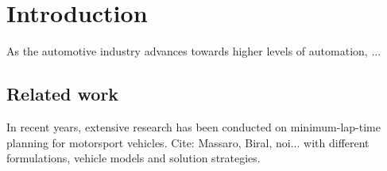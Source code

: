 \section{Introduction}
\label{sec:intro}

As the automotive industry advances towards higher levels of automation, ...

\subsection{Related work}
In recent years, extensive research has been conducted on minimum-lap-time planning for motorsport vehicles. Cite: Massaro, Biral, noi... with different formulations, vehicle models and solution strategies.

%
%

